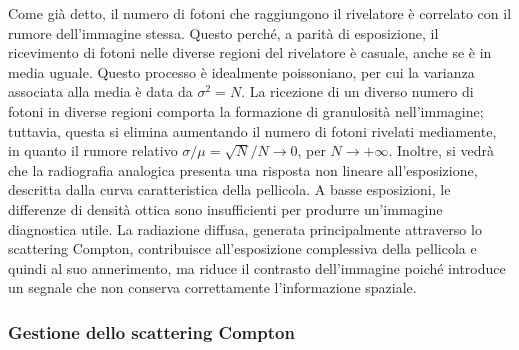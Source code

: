 \documentclass[11pt, a4paper]{scrartcl}
\theoremstyle{style}
\theoremstyle{style1}
\numberwithin{equation}{subsection}
\begin{document}
Come gi\`a detto, il numero di fotoni che raggiungono il rivelatore \`e correlato con il rumore dell'immagine stessa.
Questo perch\'e, a parit\`a di esposizione, il ricevimento di fotoni nelle diverse regioni del rivelatore \`e casuale, anche se \`e in media uguale.
Questo processo \`e idealmente poissoniano, per cui la varianza associata alla media \`e data da $\sigma ^2 = N$.
La ricezione di un diverso numero di fotoni in diverse regioni comporta la formazione di granulosit\`a nell'immagine; tuttavia, questa si elimina aumentando il numero di fotoni rivelati mediamente, in quanto il rumore relativo $\sigma /\mu = \sqrt{N}  / N \to 0 $, per $N \to  +\infty$.
Inoltre, si vedr\`a che la radiografia analogica presenta una risposta non lineare all'esposizione, descritta dalla curva caratteristica della pellicola. A basse esposizioni, le differenze di densità ottica sono insufficienti per produrre un'immagine diagnostica utile. La radiazione diffusa, generata principalmente attraverso lo scattering Compton, contribuisce all'esposizione complessiva della pellicola e quindi al suo annerimento, ma riduce il contrasto dell'immagine poiché introduce un segnale che non conserva correttamente l'informazione spaziale.

\subsubsection{Gestione dello scattering Compton}
\end{document}
